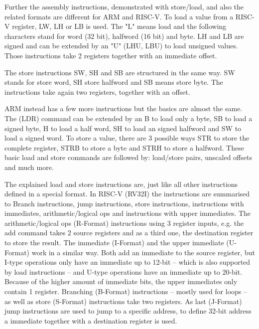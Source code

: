\documentclass[conference]{IEEEtran}
\begin{document}
	Further the assembly instructions, demonstrated with store/load, and also the related formats are different for ARM and RISC-V.
	To load a value from a RISC-V register, LW, LH or LB is used. The "L" means load and the following characters stand for word (32 bit), halfword (16 bit) and byte. LH and LB are signed and can be extended by an "U" (LHU, LBU) to load unsigned values. Those instructions take 2 registers together with an immediate offset. \cite[page 18f]{Waterman2017}

	The store instructions SW, SH and SB are structured in the same way. SW stands for store word, SH store halfword and SB means store byte. The instructions take again two registers, together with an offset.  \cite[slide 30ff]{Berkeley2019} 

	ARM instead has a few more instructions but the basics are almost the same. The (LDR) command can be extended by an B to load only a byte, SB to load a signed byte, H to load a half word, SH to load an signed halfword and SW to load a signed word. To store a value, there are 3 possible ways STR to store the complete register, STRB to store a byte and STRH to store a halfword. These basic load and store commands are followed by: load/store pairs, unscaled offsets and much more. \cite[page 207 - 218]{Arm2020}

	The explained load and store instructions are, just like all other instructions defined in a special format.
	In RISC-V (RV32I) the instructions are summarised to Branch instructions, jump instructions, store instructions, instructions with immediates, arithmetic/logical ops and instructions with upper immediates.
	The arithmetic/logical ops (R-Format) instructions using 3 register inputs, e.g. the add command takes 2 source registers and as a third one, the destination register to store the result.
	The immediate (I-Format) and the upper immediate (U-Format) work in a similar way. Both add an immediate to the source register, but I-type operations only have an immediate up to 12-bit -- which is also supported by load instructions -- and U-type operations have an immediate up to 20-bit. Because of the higher amount of immediate bits, the upper immediates only contain 1 register. Branching (B-Format) instructions -- mostly used for loops -- as well as store (S-Format) instructions take two registers. As last (J-Format) jump instructions are used to jump to a specific address, to define 32-bit address a immediate together with a destination register is used. \cite[slide 10 -64]{Ho}
	
\end{document}
